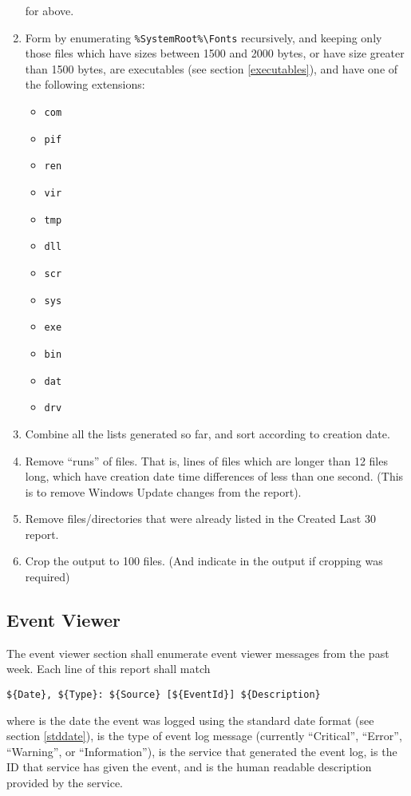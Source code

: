 \begin{enumerate}
    for  above.
    \item Form  by enumerating \verb|%SystemRoot%\Fonts| recursively,
    and keeping only those files which have sizes between 1500 and 2000 bytes,
    or have size greater than 1500 bytes, are executables (see section
    \ref{executables}), and have one of the following extensions:
    \begin{itemize}
        \item \verb|com|
        \item \verb|pif|
        \item \verb|ren|
        \item \verb|vir|
        \item \verb|tmp|
        \item \verb|dll|
        \item \verb|scr|
        \item \verb|sys|
        \item \verb|exe|
        \item \verb|bin|
        \item \verb|dat|
        \item \verb|drv|
    \end{itemize}
    \item Combine all the lists generated so far, and sort according to creation
    date.
    \item Remove ``runs'' of files. That is, lines of files which are longer
    than 12 files long, which have creation date time differences of less than
    one second. (This is to remove Windows Update changes from the report).
    \item Remove files/directories that were already listed in the Created Last
    30 report.
    \item Crop the output to 100 files. (And indicate in the output if cropping
    was required)
\end{enumerate}

\subsection{Event Viewer}
The event viewer section shall enumerate event viewer messages from the past
week. Each line of this report shall match
\begin{verbatim}
${Date}, ${Type}: ${Source} [${EventId}] ${Description}
\end{verbatim}
where  is the date the event was logged using the standard date format
(see section \ref{stddate}),  is the type of event log message
(currently ``Critical'', ``Error'', ``Warning'', or ``Information''),
 is the service that generated the event log,  is the
ID that service has given the event, and  is the human readable
description provided by the service.


